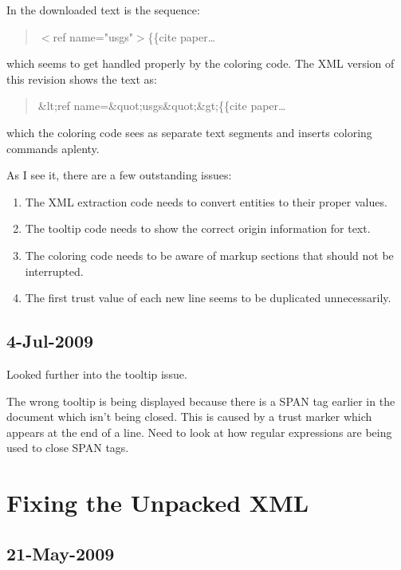 In the downloaded text is the sequence:
\begin{quote}
$<$ref name="usgs"$>$\{\{cite paper\ldots
\end{quote}
which seems to get handled properly by the coloring code.
The XML version of this revision shows the text as:
\begin{quote}
\&lt;ref name=\&quot;usgs\&quot;\&gt;\{\{cite paper\ldots
\end{quote}
which the coloring code sees as separate text segments
and inserts coloring commands aplenty.


As I see it, there are a few outstanding issues:
\begin{enumerate}
\item The XML extraction code needs to convert entities to their
    proper values.
\item The tooltip code needs to show the correct origin information
    for text.
\item The coloring code needs to be aware of markup sections
    that should not be interrupted.
\item The first trust value of each new line seems to be
    duplicated unnecessarily.
\end{enumerate}

\subsection{4-Jul-2009}

Looked further into the tooltip issue.

The wrong tooltip is being displayed because there is a SPAN tag
earlier in the document which isn't being closed.
This is caused by a trust marker which appears at the end of a line.
Need to look at how regular expressions are being used to close SPAN tags.

\section{Fixing the Unpacked XML}

\subsection{21-May-2009}
\label{sec:origin-fixxml}

